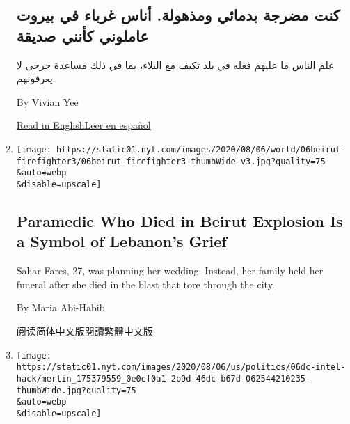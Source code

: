 \begin{enumerate}
{  \subsection{كنت مضرجة بدمائي ومذهولة. أناس غرباء في بيروت عاملوني
  كأنني
  صديقة}\label{ux643ux646ux62a-ux645ux636ux631ux62cux629-ux628ux62fux645ux627ux626ux64a-ux648ux645ux630ux647ux648ux644ux629-ux623ux646ux627ux633-ux63aux631ux628ux627ux621-ux641ux64a-ux628ux64aux631ux648ux62a-ux639ux627ux645ux644ux648ux646ux64a-ux643ux623ux646ux646ux64a-ux635ux62fux64aux642ux629}}

  علم الناس ما عليهم فعله في بلد تكيف مع البلاء، بما في ذلك مساعدة جرحى
  لا يعرفونهم.

  By Vivian Yee

  \href{https://www.nytimes.com/2020/08/04/world/middleeast/lebanon-explosion-beirut.html}{Read
  in
  English}\href{https://www.nytimes.com/es/2020/08/05/espanol/mundo/libano-explosion-beirut.html}{Leer
  en español}
\item
  \href{/2020/08/06/world/middleeast/Beirut-explosion-paramedic-Fares.html}{}

  \texttt{[image: https://static01.nyt.com/images/2020/08/06/world/06beirut-firefighter3/06beirut-firefighter3-thumbWide-v3.jpg?quality=75\\\&auto=webp\\\&disable=upscale]}

  \hypertarget{paramedic-who-died-in-beirut-explosion-is-a-symbol-of-lebanons-grief}{%
  \subsection{Paramedic Who Died in Beirut Explosion Is a Symbol of
  Lebanon's
  Grief}\label{paramedic-who-died-in-beirut-explosion-is-a-symbol-of-lebanons-grief}}

  Sahar Fares, 27, was planning her wedding. Instead, her family held
  her funeral after she died in the blast that tore through the city.

  By Maria Abi-Habib

  \href{https://cn.nytimes.com/world/20200807/beirut-explosion-paramedic-fares/}{阅读简体中文版}\href{https://cn.nytimes.com/world/20200807/beirut-explosion-paramedic-fares/zh-hant/}{閱讀繁體中文版}
\item
  \href{/2020/08/06/us/politics/election-meddling-texts-russia-iran.html}{}

  \texttt{[image: https://static01.nyt.com/images/2020/08/06/us/politics/06dc-intel-hack/merlin\_175379559\_0e0ef0a1-2b9d-46dc-b67d-062544210235-thumbWide.jpg?quality=75\\\&auto=webp\\\&disable=upscale]}


\end{enumerate}
